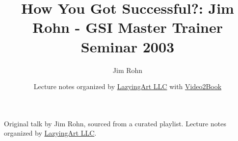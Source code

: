 \documentclass[11pt,oneside]{book}
\begin{document}
\frontmatter
\title{How You Got Successful?: Jim Rohn - GSI Master Trainer Seminar 2003}
\author{Jim Rohn}
\date{Lecture notes organized by \href{https://lazying.art}{LazyingArt LLC} with \href{https://github.com/lachlanchen/Video2Book}{Video2Book}}
\maketitle
\begin{center}
\small Original talk by Jim Rohn, sourced from a curated playlist. Lecture notes organized by \href{https://lazying.art}{LazyingArt LLC}.
\end{center}
\clearpage
\mainmatter

\end{document}
